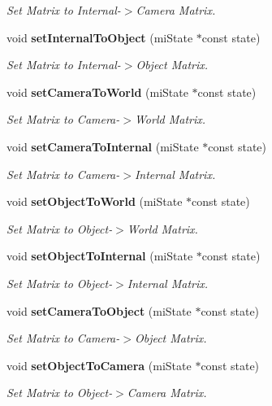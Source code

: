 \begin{CompactItemize}
\begin{CompactList}\small\item\em Set Matrix to Internal-$>$Camera Matrix. \item\end{CompactList}\item 
void {\bf set\-Internal\-To\-Object} (mi\-State $\ast$const state)
\begin{CompactList}\small\item\em Set Matrix to Internal-$>$Object Matrix. \item\end{CompactList}\item 
void {\bf set\-Camera\-To\-World} (mi\-State $\ast$const state)
\begin{CompactList}\small\item\em Set Matrix to Camera-$>$World Matrix. \item\end{CompactList}\item 
void {\bf set\-Camera\-To\-Internal} (mi\-State $\ast$const state)
\begin{CompactList}\small\item\em Set Matrix to Camera-$>$Internal Matrix. \item\end{CompactList}\item 
void {\bf set\-Object\-To\-World} (mi\-State $\ast$const state)
\begin{CompactList}\small\item\em Set Matrix to Object-$>$World Matrix. \item\end{CompactList}\item 
void {\bf set\-Object\-To\-Internal} (mi\-State $\ast$const state)
\begin{CompactList}\small\item\em Set Matrix to Object-$>$Internal Matrix. \item\end{CompactList}\item 
void {\bf set\-Camera\-To\-Object} (mi\-State $\ast$const state)
\begin{CompactList}\small\item\em Set Matrix to Camera-$>$Object Matrix. \item\end{CompactList}\item 
void {\bf set\-Object\-To\-Camera} (mi\-State $\ast$const state)
\begin{CompactList}\small\item\em Set Matrix to Object-$>$Camera Matrix. \item\end{CompactList}\end{CompactItemize}
